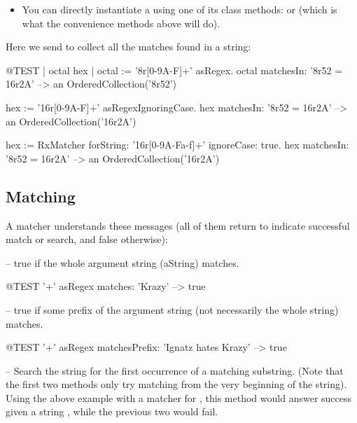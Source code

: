 \documentclass[a4paper,10pt,twoside]{book}
\begin{document}
{\begin{itemize}
\item You can directly instantiate a  using one of its class methods:
   or
   (which is what the
  convenience methods above will do).
\end{itemize}

Here we send  to collect all the matches found in a string:

\begin{code}{@TEST | octal hex |}
octal := '8r[0-9A-F]+' asRegex.
octal matchesIn: '8r52 = 16r2A' --> an OrderedCollection('8r52')

hex := '16r[0-9A-F]+' asRegexIgnoringCase.
hex matchesIn: '8r52 = 16r2A'   --> an OrderedCollection('16r2A')

hex := RxMatcher forString: '16r[0-9A-Fa-f]+' ignoreCase: true.
hex matchesIn: '8r52 = 16r2A'   --> an OrderedCollection('16r2A')
\end{code}

\subsection{Matching}

A matcher understands these messages (all of them return  to indicate successful match or search, and false otherwise):

  -- true if the whole argument string (aString) matches.

\begin{code}{@TEST}
'\w+' asRegex matches: 'Krazy' --> true
\end{code}

  -- true if some prefix of the argument string (not necessarily the whole string) matches.

\begin{code}{@TEST}
'\w+' asRegex matchesPrefix: 'Ignatz hates Krazy' --> true
\end{code}

  -- Search the string for the first occurrence of a matching substring. (Note that the first two methods only try matching from  the very beginning of the string). Using the above example with a  matcher for , this method would answer success given a string , while the previous two would fail.

}
\end{document}
